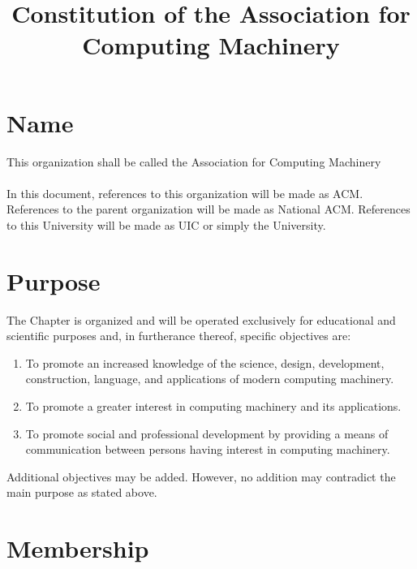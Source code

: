 \documentclass[12pt,titlepage]{article}
\begin{document}
\title{Constitution of the Association for Computing Machinery}
\maketitle

\tableofcontents

\pagebreak

\section{Name}

This organization shall be called the Association for Computing Machinery\\
\\
In this document, references to this organization will be made as ACM. References to the parent organization will be made as National ACM. References to this University will be made as UIC or simply the University.

\section{Purpose}

The Chapter is organized and will be operated exclusively for educational and scientific purposes and, in furtherance thereof, specific objectives are:
\begin{enumerate}
\item To promote an increased knowledge of the science, design, development, construction, language, and applications of modern computing machinery.
\item To promote a greater interest in computing machinery and its applications.
\item To promote social and professional development by providing a means of communication between persons having interest in computing machinery.
\end{enumerate}
Additional objectives may be added. However, no addition may contradict the main purpose as stated above.

\section{Membership}
\end{document}
